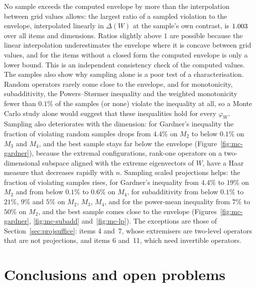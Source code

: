 \documentclass[11pt]{article}
\theoremstyle{plain}
\theoremstyle{definition}
\theoremstyle{remark}
\begin{document}
No sample exceeds the computed envelope by more than the interpolation between grid values allows: the largest ratio of
a sampled violation to the envelope, interpolated linearly in $\Delta(W)$ at the sample's own contrast, is
$1.003$ over all items and dimensions. Ratios slightly above $1$ are possible because the linear interpolation
underestimates the envelope where it is concave between grid values, and for the items without a closed form the
computed envelope is only a lower bound. This is an independent consistency check of the computed values. The samples also show why sampling alone is
a poor test of a characterisation. Random operators rarely come close to the envelope, and for monotonicity,
subadditivity, the Powers--St{\o}rmer inequality and the weighted monotonicity fewer than $0.1\%$ of the samples (or none)
violate the inequality at all, so a Monte Carlo study alone would suggest that these inequalities hold for every
$\varphi_W$. Sampling also deteriorates with the dimension: for Gardner's inequality the fraction of violating random
samples drops from $4.4\%$ on $M_2$ to below $0.1\%$ on $M_3$ and $M_4$, and the best sample stays far below the envelope
(Figure~\ref{fig:mc-gardner}), because the extremal configurations, rank-one operators on a two-dimensional subspace
aligned with the extreme eigenvectors of $W$, have a Haar measure that decreases rapidly with $n$. Sampling scaled
projections helps: the fraction of violating samples rises, for Gardner's inequality from $4.4\%$ to $19\%$ on $M_2$ and
from below $0.1\%$ to $0.6\%$ on $M_4$, for subadditivity from below $0.1\%$ to $21\%$, $9\%$ and $5\%$ on $M_2$, $M_3$,
$M_4$, and for the power-mean inequality from $7\%$ to $50\%$ on $M_2$, and the best sample comes close to the envelope
(Figures~\ref{fig:mc-gardner}, \ref{fig:mc-subadd} and~\ref{fig:mc-lp}). The exceptions are those of
Section~\ref{sec:projsuffice}: items 4 and~7, whose extremisers are two-level operators that are not projections, and
items 6 and~11, which need invertible operators.

\section{Conclusions and open problems}\label{sec:open}
\end{document}
